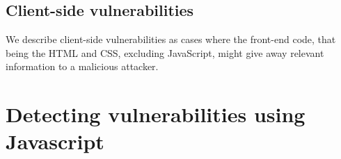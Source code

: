 \subsection{Client-side vulnerabilities}
We describe client-side vulnerabilities as cases where the front-end code, that being the HTML and CSS, excluding JavaScript, might give away relevant information to a malicious attacker.

\section{Detecting vulnerabilities using Javascript}